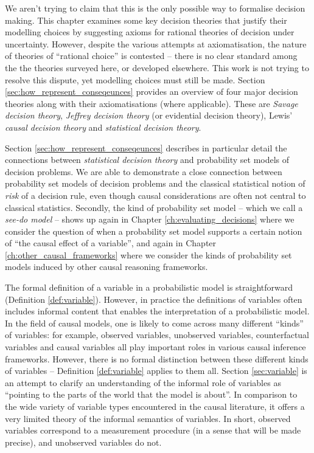 We aren't trying to claim that this is the only possible way to formalise decision making. This chapter examines some key decision theories that justify their modelling choices by suggesting axioms for rational theories of decision under uncertainty. However, despite the various attempts at axiomatisation, the nature of theories of ``rational choice'' is contested -- there is no clear standard among the the theories surveyed here, or developed elsewhere. This work is not trying to resolve this dispute, yet modelling choices must still be made. Section \ref{sec:how_represent_conseqeunces} provides an overview of four major decision theories along with their axiomatisations (where applicable). These are \emph{Savage decision theory}, \emph{Jeffrey decision theory} (or evidential decision theory), Lewis' \emph{causal decision theory} and \emph{statistical decision theory}.

Section \ref{sec:how_represent_conseqeunces} describes in particular detail the connections between \emph{statistical decision theory} \citep{wald_statistical_1950} and probability set models of decision problems. We are able to demonstrate a close connection between probability set models of decision problems and the classical statistical notion of \emph{risk} of a decision rule, even though causal considerations are often not central to classical statistics. Secondly, the kind of probability set model -- which we call a \emph{see-do model} -- shows up again in Chapter \ref{ch:evaluating_decisions} where we consider the question of when a probability set model supports a certain notion of ``the causal effect of a variable'', and again in Chapter \ref{ch:other_causal_frameworks} where we consider the kinds of probability set models induced by other causal reasoning frameworks.

The formal definition of a variable in a probabilistic model is straightforward (Definition \ref{def:variable}). However, in practice the definitions of variables often includes informal content that enables the interpretation of a probabilistic model. In the field of causal models, one is likely to come across many different ``kinds'' of variables: for example, observed variables, unobserved variables, counterfactual variables and causal variables all play important roles in various causal inference frameworks. However, there is no formal distinction between these different kinds of variables -- Definition \ref{def:variable} applies to them all. Section \ref{sec:variable} is an attempt to clarify an understanding of the informal role of variables as ``pointing to the parts of the world that the model is about''. In comparison to the wide variety of variable types encountered in the causal literature, it offers a very limited theory of the informal semantics of variables. In short, observed variables correspond to a measurement procedure (in a sense that will be made precise), and unobserved variables do not.

